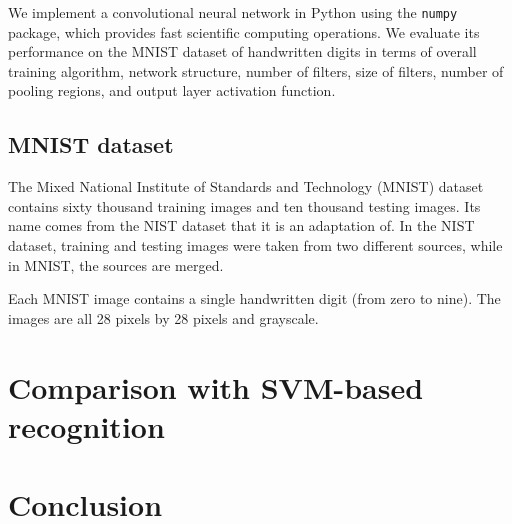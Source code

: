 \documentclass[12pt,twocolumn]{article}
\begin{document}
We implement a convolutional neural network in Python using the \texttt{numpy} package, which provides fast scientific computing operations. We evaluate its performance on the MNIST dataset of handwritten digits in terms of overall training algorithm, network structure, number of filters, size of filters, number of pooling regions, and output layer activation function.

\subsection{MNIST dataset}

The Mixed National Institute of Standards and Technology (MNIST) dataset contains sixty thousand training images and ten thousand testing images. Its name comes from the NIST dataset that it is an adaptation of. In the NIST dataset, training and testing images were taken from two different sources, while in MNIST, the sources are merged.

Each MNIST image contains a single handwritten digit (from zero to nine). The images are all 28 pixels by 28 pixels and grayscale.

\section{Comparison with SVM-based recognition} \label{sec:evalfeature}

\section{Conclusion}

\end{document}
